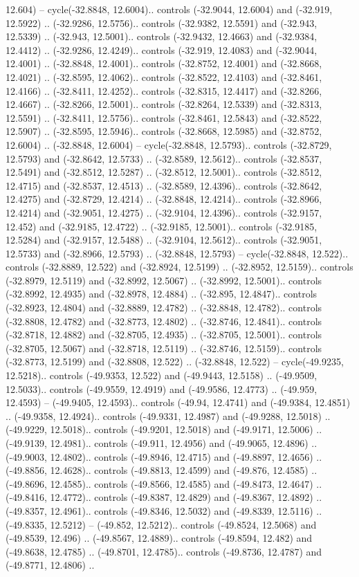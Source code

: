 \begin{scope}[shift={(2.5552, 9.9912)}]
\begin{scope}[shift={(48.1654, -14.8546)}]
12.604) -- cycle(-32.8848, 12.6004).. controls (-32.9044, 12.6004) and (-32.919, 12.5922) .. (-32.9286, 12.5756).. controls (-32.9382, 12.5591) and (-32.943, 12.5339) .. (-32.943, 12.5001).. controls (-32.9432, 12.4663) and (-32.9384, 12.4412) .. (-32.9286, 12.4249).. controls (-32.919, 12.4083) and (-32.9044, 12.4001) .. (-32.8848, 12.4001).. controls (-32.8752, 12.4001) and (-32.8668, 12.4021) .. (-32.8595, 12.4062).. controls (-32.8522, 12.4103) and (-32.8461, 12.4166) .. (-32.8411, 12.4252).. controls (-32.8315, 12.4417) and (-32.8266, 12.4667) .. (-32.8266, 12.5001).. controls (-32.8264, 12.5339) and (-32.8313, 12.5591) .. (-32.8411, 12.5756).. controls (-32.8461, 12.5843) and (-32.8522, 12.5907) .. (-32.8595, 12.5946).. controls (-32.8668, 12.5985) and (-32.8752, 12.6004) .. (-32.8848, 12.6004) -- cycle(-32.8848, 12.5793).. controls (-32.8729, 12.5793) and (-32.8642, 12.5733) .. (-32.8589, 12.5612).. controls (-32.8537, 12.5491) and (-32.8512, 12.5287) .. (-32.8512, 12.5001).. controls (-32.8512, 12.4715) and (-32.8537, 12.4513) .. (-32.8589, 12.4396).. controls (-32.8642, 12.4275) and (-32.8729, 12.4214) .. (-32.8848, 12.4214).. controls (-32.8966, 12.4214) and (-32.9051, 12.4275) .. (-32.9104, 12.4396).. controls (-32.9157, 12.452) and (-32.9185, 12.4722) .. (-32.9185, 12.5001).. controls (-32.9185, 12.5284) and (-32.9157, 12.5488) .. (-32.9104, 12.5612).. controls (-32.9051, 12.5733) and (-32.8966, 12.5793) .. (-32.8848, 12.5793) -- cycle(-32.8848, 12.522).. controls (-32.8889, 12.522) and (-32.8924, 12.5199) .. (-32.8952, 12.5159).. controls (-32.8979, 12.5119) and (-32.8992, 12.5067) .. (-32.8992, 12.5001).. controls (-32.8992, 12.4935) and (-32.8978, 12.4884) .. (-32.895, 12.4847).. controls (-32.8923, 12.4804) and (-32.8889, 12.4782) .. (-32.8848, 12.4782).. controls (-32.8808, 12.4782) and (-32.8773, 12.4802) .. (-32.8746, 12.4841).. controls (-32.8718, 12.4882) and (-32.8705, 12.4935) .. (-32.8705, 12.5001).. controls (-32.8705, 12.5067) and (-32.8718, 12.5119) .. (-32.8746, 12.5159).. controls (-32.8773, 12.5199) and (-32.8808, 12.522) .. (-32.8848, 12.522) -- cycle(-49.9235, 12.5218).. controls (-49.9353, 12.522) and (-49.9443, 12.5158) .. (-49.9509, 12.5033).. controls (-49.9559, 12.4919) and (-49.9586, 12.4773) .. (-49.959, 12.4593) -- (-49.9405, 12.4593).. controls (-49.94, 12.4741) and (-49.9384, 12.4851) .. (-49.9358, 12.4924).. controls (-49.9331, 12.4987) and (-49.9288, 12.5018) .. (-49.9229, 12.5018).. controls (-49.9201, 12.5018) and (-49.9171, 12.5006) .. (-49.9139, 12.4981).. controls (-49.911, 12.4956) and (-49.9065, 12.4896) .. (-49.9003, 12.4802).. controls (-49.8946, 12.4715) and (-49.8897, 12.4656) .. (-49.8856, 12.4628).. controls (-49.8813, 12.4599) and (-49.876, 12.4585) .. (-49.8696, 12.4585).. controls (-49.8566, 12.4585) and (-49.8473, 12.4647) .. (-49.8416, 12.4772).. controls (-49.8387, 12.4829) and (-49.8367, 12.4892) .. (-49.8357, 12.4961).. controls (-49.8346, 12.5032) and (-49.8339, 12.5116) .. (-49.8335, 12.5212) -- (-49.852, 12.5212).. controls (-49.8524, 12.5068) and (-49.8539, 12.496) .. (-49.8567, 12.4889).. controls (-49.8594, 12.482) and (-49.8638, 12.4785) .. (-49.8701, 12.4785).. controls (-49.8736, 12.4787) and (-49.8771, 12.4806) .. 
\end{scope}
\end{scope}
